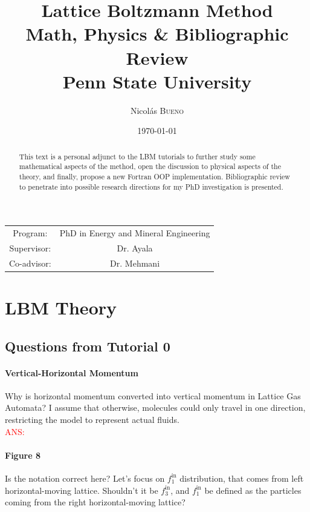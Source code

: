 \documentclass{article}
\title{Lattice Boltzmann Method\\ Math, Physics \& Bibliographic Review\\Penn State University} %
\author{Nicolás \textsc{Bueno}} %
\date{\today} %
\begin{document}
	
	\maketitle %
	
	\begin{center}
		\begin{tabular}{c c}
			Program: & PhD in Energy and Mineral Engineering\\
			Supervisor: & Dr. Ayala\\
			Co-advisor: & Dr. Mehmani
		\end{tabular}
	\end{center}
	
	 \begin{abstract}
	This text is a personal adjunct to the LBM tutorials to further study some mathematical aspects of the method, open the discussion to physical aspects of the theory, and finally, propose a new Fortran OOP implementation. Bibliographic review to penetrate into possible research directions for my PhD investigation is presented. 
	 \end{abstract}
	
	\tableofcontents
	
	\newpage
	
	\section{LBM Theory}
	
	\subsection{Questions from Tutorial 0}
	\paragraph{Vertical-Horizontal Momentum}
	Why is horizontal momentum converted into vertical momentum in Lattice Gas Automata? I assume that otherwise, molecules could only travel in one direction, restricting the model to represent actual fluids.\\
	
	\textcolor{red}{ANS:}
	
	\paragraph{Figure 8} Is the notation correct here? Let's focus on $f^{\text{in}}_1$ distribution, that comes from left horizontal-moving lattice. Shouldn't it be $f^{\text{in}}_3$, and $f^{\text{in}}_1$ be defined as the particles coming from the right horizontal-moving lattice?\\
	
\end{document}
